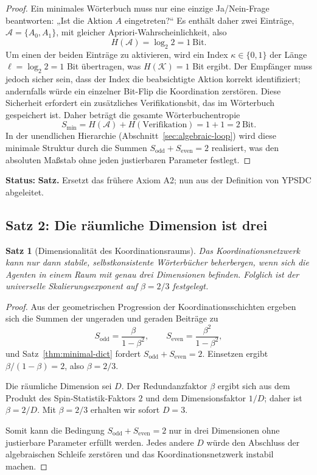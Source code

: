 \documentclass[12pt,a4paper]{article}
\newtheorem{theorem}{Satz}[section]
\begin{document}
	\begin{proof}
		Ein minimales Wörterbuch muss nur eine einzige Ja/Nein-Frage beantworten: „Ist die Aktion \(A\) eingetreten?“ Es enthält daher zwei Einträge, \(\mathcal{A} = \{A_0, A_1\}\), mit gleicher Apriori-Wahrscheinlichkeit, also
		\[
		H(\mathcal{A}) = \log_2 2 = 1\ \text{Bit}.
		\]
		Um einen der beiden Einträge zu aktivieren, wird ein Index \(\kappa \in \{0,1\}\) der Länge \(\ell = \log_2 2 = 1\) Bit übertragen, was \(H(\mathcal{K}) = 1\) Bit ergibt. Der Empfänger muss jedoch sicher sein, dass der Index die beabsichtigte Aktion korrekt identifiziert; andernfalls würde ein einzelner Bit-Flip die Koordination zerstören. Diese Sicherheit erfordert ein zusätzliches Verifikationsbit, das im Wörterbuch gespeichert ist. Daher beträgt die gesamte Wörterbuchentropie
		\[
		S_{\min} = H(\mathcal{A}) + H(\text{Verifikation}) = 1 + 1 = 2\ \text{Bit}.
		\]
		In der unendlichen Hierarchie (Abschnitt~\ref{sec:algebraic-loop}) wird diese minimale Struktur durch die Summen \(S_{\mathrm{odd}} + S_{\mathrm{even}} = 2\) realisiert, was den absoluten Maßstab ohne jeden justierbaren Parameter festlegt.
	\end{proof}
	
	\textbf{Status:} \textbf{Satz.} Ersetzt das frühere Axiom A2; nun aus der Definition von YPSDC abgeleitet.
	
	\subsection{Satz 2: Die räumliche Dimension ist drei}
	
	\begin{theorem}[Dimensionalität des Koordinationsraums]
		\label{thm:dimension}
		Das Koordinationsnetzwerk kann nur dann stabile, selbstkonsistente Wörterbücher beherbergen, wenn sich die Agenten in einem Raum mit genau drei Dimensionen befinden. Folglich ist der universelle Skalierungsexponent auf \(\beta = 2/3\) festgelegt.
	\end{theorem}
	
	\begin{proof}
		Aus der geometrischen Progression der Koordinationsschichten ergeben sich die Summen der ungeraden und geraden Beiträge zu
		\[
		S_{\mathrm{odd}} = \frac{\beta}{1-\beta^2}, \qquad
		S_{\mathrm{even}} = \frac{\beta^2}{1-\beta^2},
		\]
		und Satz~\ref{thm:minimal-dict} fordert \(S_{\mathrm{odd}} + S_{\mathrm{even}} = 2\).
		Einsetzen ergibt \(\beta/(1-\beta) = 2\), also \(\beta = 2/3\).
		
		Die räumliche Dimension sei \(D\). Der Redundanzfaktor \(\beta\) ergibt sich aus dem Produkt des Spin-Statistik-Faktors \(2\) und dem Dimensionsfaktor \(1/D\); daher ist \(\beta = 2/D\). Mit \(\beta = 2/3\) erhalten wir sofort \(D = 3\).
		
		Somit kann die Bedingung \(S_{\mathrm{odd}} + S_{\mathrm{even}} = 2\) nur in drei Dimensionen ohne justierbare Parameter erfüllt werden. Jedes andere \(D\) würde den Abschluss der algebraischen Schleife zerstören und das Koordinationsnetzwerk instabil machen.
	\end{proof}
	
\end{document}

